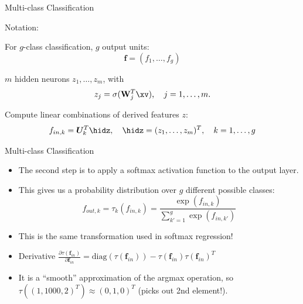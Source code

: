 {\begin{frame} {Multi-class Classification}
\vspace{5mm}
\begin{blocki}{Notation:}
\item For $g$-class classification, $g$ output units: $$\mathbf{f} = (f_1, \dots, f_g)$$
\vspace{4mm}
\item $m$ hidden neurons $z_1, \dots, z_m$, with
    $$ z_j = \sigma(\mathbf{W}_j^T \xv), \quad j = 1,\ldots,m. $$
\item Compute linear combinations of derived features $z$:
    $$ f_{in,k} = \bm{U}_k^T \hidz, \quad \hidz=(z_1,\dots, z_m)^T, \quad k = 1,\ldots,g$$
\end{blocki}
\end{frame}

\begin{frame} {Multi-class Classification}
  \begin{itemize}
    \item The second step is to apply a softmax activation function to the output layer.
    \vspace{4mm}
    \item This gives us a probability distribution over $g$ different possible classes:
    $$ f_{out,k} = \tau_k(f_{in,k}) = \frac{\exp(f_{in,k})}{\sum_{k'=1}^g\exp(f_{in,k'})}$$
    \vspace{2mm}
    \item This is the same transformation used in softmax regression!
    \vspace{4mm}
    \item Derivative $ \frac{\partial \tau(\mathbf{f}_{in})}{\partial \mathbf{f}_{in}} = \text{diag}(\tau(\mathbf{f}_{in})) - \tau(\mathbf{f}_{in}) \tau(\mathbf{f}_{in})^T $
    \vspace{4mm}
    \item It is a \enquote{smooth} approximation of the argmax operation,
        so $\tau((1, 1000, 2)^T) \approx (0, 1, 0)^T$ (picks out 2nd element!).
  \end{itemize}
\end{frame}

}
